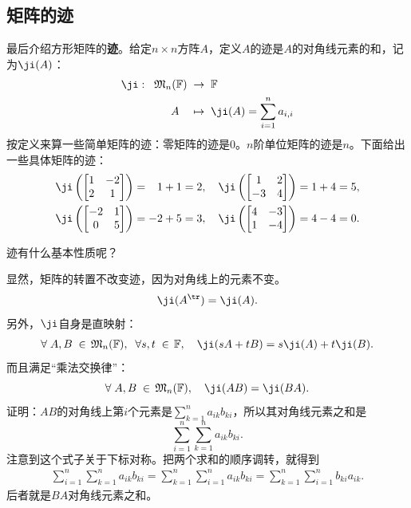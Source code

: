 \documentclass[12pt,UTF8]{ctexbook}
\begin{document}
\subsection{矩阵的迹}
最后介绍方形矩阵的\textbf{迹}。给定$n\times n$方阵$A$，定义$A$的迹是$A$的对角线元素的和，记为$\ji(A)$：
\begin{align*}
    \ji:\;\; \mathfrak{M}_n(\mathbb{F})\; &\rightarrow \; \mathbb{F} \\
    A \quad &\mapsto \; \ji(A) = \sum_{i=1}^n a_{i,i}
\end{align*}
按定义来算一些简单矩阵的迹：零矩阵的迹是$0$。$n$阶单位矩阵的迹是$n$。下面给出一些具体矩阵的迹：
\begin{align*}
    \ji\left(\begin{bmatrix}
        1 & -2 \\ 2 & 1
    \end{bmatrix}\right)
    &= \phantom{-}1 + 1 = 2, \quad 
    \ji\left(\begin{bmatrix}
        1 & 2 \\ -3 & 4
    \end{bmatrix}\right)
    = 1 + 4 = 5, \\
    \ji\left(\begin{bmatrix}
        -2 & 1 \\ 0 & 5
    \end{bmatrix}\right)
    &= -2 + 5 = 3,\quad
    \ji\left(\begin{bmatrix}
        4 & -3 \\ 1 & -4
    \end{bmatrix}\right)
    = 4 - 4 = 0.
\end{align*}

迹有什么基本性质呢？

显然，矩阵的转置不改变迹，因为对角线上的元素不变。
$$ \ji(A^{\tr}) = \ji(A).$$
另外，$\ji$自身是直映射：
\begin{align*}
    \forall \; A, B \; \in \, \mathfrak{M}_n(\mathbb{F}), \;\; \forall s, t \; \in \, \mathbb{F}, \quad \ji(sA + tB) = s\ji(A) + t\ji(B).
\end{align*}
而且满足“乘法交换律”：
$$ \forall \; A, B \; \in \, \mathfrak{M}_n(\mathbb{F}), \quad \ji(AB) = \ji(BA). $$
证明：$AB$的对角线上第$i$个元素是$\sum_{k=1}^n a_{ik} b_{ki}$，所以其对角线元素之和是
$$ \sum_{i=1}^n \sum_{k=1}^n a_{ik} b_{ki}. $$
注意到这个式子关于下标对称。把两个求和的顺序调转，就得到
\begin{align*}
    \sum_{i=1}^n \sum_{k=1}^n a_{ik} b_{ki} = \sum_{k=1}^n \sum_{i=1}^n a_{ik} b_{ki} = \sum_{k=1}^n \sum_{i=1}^n b_{ki} a_{ik}.
\end{align*}
后者就是$BA$对角线元素之和。
\end{document}
